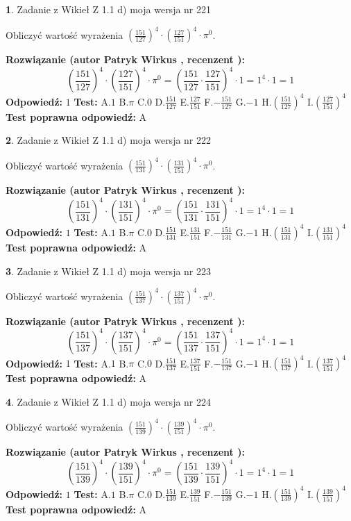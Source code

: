 \documentclass[12pt, a4paper]{article}
\theoremstyle{definition} %
\newtheorem{zad}{}
\newcommand{\zadStart}[1]{\begin{zad}#1\newline}
\newcommand{\zadStop}{\end{zad}}
\newcommand{\rozwStart}[2]{\noindent \textbf{Rozwiązanie (autor #1 , recenzent #2): }\newline}
\newcommand{\rozwStop}{\newline}
\newcommand{\odpStart}{\noindent \textbf{Odpowiedź:}\newline}
\newcommand{\odpStop}{\newline}
\newcommand{\testStart}{\noindent \textbf{Test:}\newline}
\newcommand{\testStop}{\newline}
\newcommand{\kluczStart}{\noindent \textbf{Test poprawna odpowiedź:}\newline}
\newcommand{\kluczStop}{\newline}
\begin{document}
\zadStart{Zadanie z Wikieł Z 1.1 d) moja wersja nr 221}

Obliczyć wartość wyrażenia $(\frac{151}{127})^{4} \cdot (\frac{127}{151})^{4} \cdot \pi^{0}$.
\zadStop
\rozwStart{Patryk Wirkus}{}
$$(\frac{151}{127})^{4} \cdot (\frac{127}{151})^{4} \cdot \pi^{0} = (\frac{151}{127} \cdot \frac{127}{151})^{4} \cdot 1 = 1^{4} \cdot 1 = 1$$
\rozwStop
\odpStart
$1$
\odpStop
\testStart
A.$1$ B.$\pi$ C.$0$ D.$\frac{151}{127}$ E.$\frac{127}{151}$
F.$-\frac{151}{127}$ G.$-1$
H.$(\frac{151}{127})^{4}$
I.$(\frac{127}{151})^{4}$
\testStop
\kluczStart
A
\kluczStop



\zadStart{Zadanie z Wikieł Z 1.1 d) moja wersja nr 222}

Obliczyć wartość wyrażenia $(\frac{151}{131})^{4} \cdot (\frac{131}{151})^{4} \cdot \pi^{0}$.
\zadStop
\rozwStart{Patryk Wirkus}{}
$$(\frac{151}{131})^{4} \cdot (\frac{131}{151})^{4} \cdot \pi^{0} = (\frac{151}{131} \cdot \frac{131}{151})^{4} \cdot 1 = 1^{4} \cdot 1 = 1$$
\rozwStop
\odpStart
$1$
\odpStop
\testStart
A.$1$ B.$\pi$ C.$0$ D.$\frac{151}{131}$ E.$\frac{131}{151}$
F.$-\frac{151}{131}$ G.$-1$
H.$(\frac{151}{131})^{4}$
I.$(\frac{131}{151})^{4}$
\testStop
\kluczStart
A
\kluczStop



\zadStart{Zadanie z Wikieł Z 1.1 d) moja wersja nr 223}

Obliczyć wartość wyrażenia $(\frac{151}{137})^{4} \cdot (\frac{137}{151})^{4} \cdot \pi^{0}$.
\zadStop
\rozwStart{Patryk Wirkus}{}
$$(\frac{151}{137})^{4} \cdot (\frac{137}{151})^{4} \cdot \pi^{0} = (\frac{151}{137} \cdot \frac{137}{151})^{4} \cdot 1 = 1^{4} \cdot 1 = 1$$
\rozwStop
\odpStart
$1$
\odpStop
\testStart
A.$1$ B.$\pi$ C.$0$ D.$\frac{151}{137}$ E.$\frac{137}{151}$
F.$-\frac{151}{137}$ G.$-1$
H.$(\frac{151}{137})^{4}$
I.$(\frac{137}{151})^{4}$
\testStop
\kluczStart
A
\kluczStop



\zadStart{Zadanie z Wikieł Z 1.1 d) moja wersja nr 224}

Obliczyć wartość wyrażenia $(\frac{151}{139})^{4} \cdot (\frac{139}{151})^{4} \cdot \pi^{0}$.
\zadStop
\rozwStart{Patryk Wirkus}{}
$$(\frac{151}{139})^{4} \cdot (\frac{139}{151})^{4} \cdot \pi^{0} = (\frac{151}{139} \cdot \frac{139}{151})^{4} \cdot 1 = 1^{4} \cdot 1 = 1$$
\rozwStop
\odpStart
$1$
\odpStop
\testStart
A.$1$ B.$\pi$ C.$0$ D.$\frac{151}{139}$ E.$\frac{139}{151}$
F.$-\frac{151}{139}$ G.$-1$
H.$(\frac{151}{139})^{4}$
I.$(\frac{139}{151})^{4}$
\testStop
\kluczStart
A
\kluczStop
\end{document}
